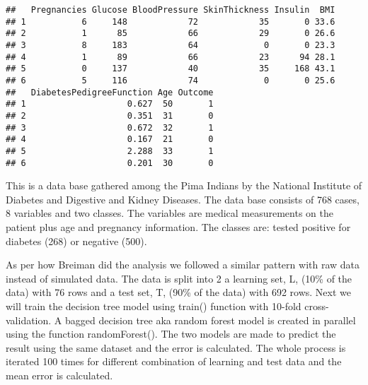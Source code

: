 \documentclass[
]{article}
\newenvironment{Shaded}{\begin{snugshade}}{\end{snugshade}}
\newcommand{\AttributeTok}[1]{\textcolor[rgb]{0.77,0.63,0.00}{#1}}
\newcommand{\CommentTok}[1]{\textcolor[rgb]{0.56,0.35,0.01}{\textit{#1}}}
\newcommand{\ConstantTok}[1]{\textcolor[rgb]{0.00,0.00,0.00}{#1}}
\newcommand{\DecValTok}[1]{\textcolor[rgb]{0.00,0.00,0.81}{#1}}
\newcommand{\FunctionTok}[1]{\textcolor[rgb]{0.00,0.00,0.00}{#1}}
\newcommand{\NormalTok}[1]{#1}
\newcommand{\OtherTok}[1]{\textcolor[rgb]{0.56,0.35,0.01}{#1}}
\newcommand{\SpecialCharTok}[1]{\textcolor[rgb]{0.00,0.00,0.00}{#1}}
\newcommand{\StringTok}[1]{\textcolor[rgb]{0.31,0.60,0.02}{#1}}
\begin{document}
\begin{Shaded}
\end{Shaded}

\begin{verbatim}
##   Pregnancies Glucose BloodPressure SkinThickness Insulin  BMI
## 1           6     148            72            35       0 33.6
## 2           1      85            66            29       0 26.6
## 3           8     183            64             0       0 23.3
## 4           1      89            66            23      94 28.1
## 5           0     137            40            35     168 43.1
## 6           5     116            74             0       0 25.6
##   DiabetesPedigreeFunction Age Outcome
## 1                    0.627  50       1
## 2                    0.351  31       0
## 3                    0.672  32       1
## 4                    0.167  21       0
## 5                    2.288  33       1
## 6                    0.201  30       0
\end{verbatim}

This is a data base gathered among the Pima Indians by the National
Institute of Diabetes and Digestive and Kidney Diseases. The data base
consists of 768 cases, 8 variables and two classes. The variables are
medical measurements on the patient plus age and pregnancy information.
The classes are: tested positive for diabetes (268) or negative (500).

As per how Breiman did the analysis we followed a similar pattern with
raw data instead of simulated data. The data is split into 2 a learning
set, L, (10\% of the data) with 76 rows and a test set, T, (90\% of the
data) with 692 rows. Next we will train the decision tree model using
train() function with 10-fold cross-validation. A bagged decision tree
aka random forest model is created in parallel using the function
randomForest(). The two models are made to predict the result using the
same dataset and the error is calculated. The whole process is iterated
100 times for different combination of learning and test data and the
mean error is calculated.
\end{document}
